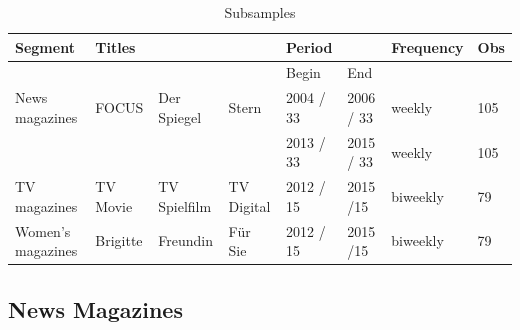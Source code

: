 \documentclass[12pt,a4paper,notitlepage]{article}
\begin{document}
\begin{center}
\begin{table}[htbp]
	
	\caption{Subsamples}
\begin{adjustbox}{width=\textwidth}	
\begin{scriptsize}
\bigskip\begin{tabular}{llllllll}
\hline 
	 Segment 	& Titles & & & Period &  & Frequency & Obs \\ \hline
	 &  &  &  & Begin & End &  &  \\ \hline
	News magazines 		& FOCUS & Der Spiegel & Stern & 2004 / 33 & 2006 / 33 & weekly & 105 \\ \hline
	 &  &  &  & 2013 / 33 & 2015 / 33 & weekly & 105 \\ \hline
	TV magazines 			& TV Movie & TV Spielfilm & TV Digital & 2012 / 15 & 2015 /15 & biweekly & 79 \\ \hline
	Women's magazines	& Brigitte & Freundin & Für Sie & 2012 / 15 & 2015 /15 & biweekly & 79 \\ \hline
\end{tabular}
\end{scriptsize}
	\label{tab:sample selection}
\end{adjustbox}
\end{table}
\end{center}

\subsection{News Magazines} 
\end{document}
